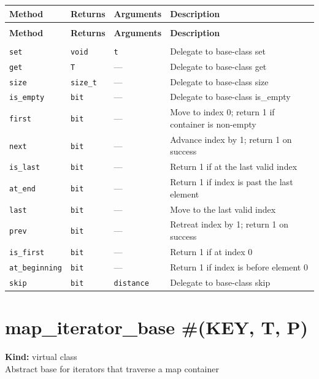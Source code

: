 \documentclass[11pt,letterpaper]{report}
\begin{document}
\begin{xltabular}{\linewidth}{>{\small}p{1.35in} >{\small}p{1.25in} >{\small}p{0.95in} >{\small}X}
\toprule
\textbf{Method} & \textbf{Returns} & \textbf{Arguments} & \textbf{Description} \\
\midrule
\endfirsthead
{} \\
\midrule
\textbf{Method} & \textbf{Returns} & \textbf{Arguments} & \textbf{Description} \\
\midrule
\endhead
\midrule
{} \\
\endfoot
\bottomrule
\endlastfoot
\texttt{set} & \texttt{void} & \texttt{t} & Delegate to base-class set \\
\texttt{get} & \texttt{T} & --- & Delegate to base-class get \\
\texttt{size} & \texttt{size\_t} & --- & Delegate to base-class size \\
\texttt{is\_empty} & \texttt{bit} & --- & Delegate to base-class is\_empty \\
\texttt{first} & \texttt{bit} & --- & Move to index 0; return 1 if container is non-empty \\
\texttt{next} & \texttt{bit} & --- & Advance index by 1; return 1 on success \\
\texttt{is\_last} & \texttt{bit} & --- & Return 1 if at the last valid index \\
\texttt{at\_end} & \texttt{bit} & --- & Return 1 if index is past the last element \\
\texttt{last} & \texttt{bit} & --- & Move to the last valid index \\
\texttt{prev} & \texttt{bit} & --- & Retreat index by 1; return 1 on success \\
\texttt{is\_first} & \texttt{bit} & --- & Return 1 if at index 0 \\
\texttt{at\_beginning} & \texttt{bit} & --- & Return 1 if index is before element 0 \\
\texttt{skip} & \texttt{bit} & \texttt{distance} & Delegate to base-class skip \\
\end{xltabular}

\section{map\_iterator\_base \#(KEY, T, P)}
\label{cls:mapiteratorbaseKEYTP}

\noindent\textbf{Kind:} virtual class\\
\noindent Abstract base for iterators that traverse a map container
\end{document}
